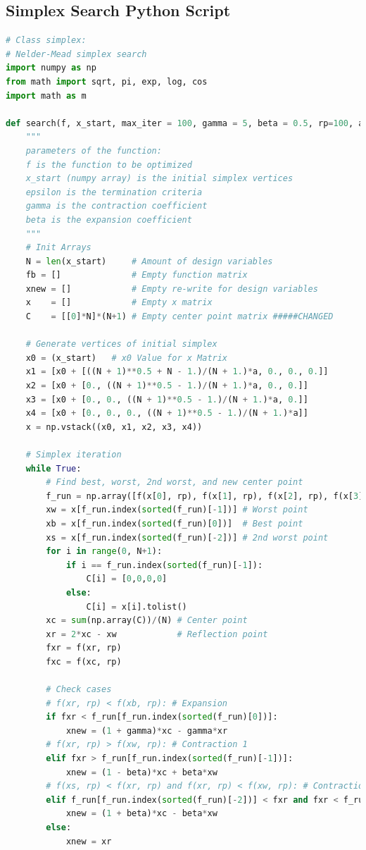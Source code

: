\documentclass[]{aiaa-tc}%
\begin{document}
\subsection{Simplex Search Python Script}
\begin{lstlisting}[language=Python]
# Class simplex: 
# Nelder-Mead simplex search
import numpy as np
from math import sqrt, pi, exp, log, cos
import math as m

def search(f, x_start, max_iter = 100, gamma = 5, beta = 0.5, rp=100, a=10, epsilon = 1E-6):
    """
    parameters of the function:
    f is the function to be optimized
    x_start (numpy array) is the initial simplex vertices
    epsilon is the termination criteria
    gamma is the contraction coefficient
    beta is the expansion coefficient
    """
    # Init Arrays
    N = len(x_start)     # Amount of design variables
    fb = []              # Empty function matrix
    xnew = []            # Empty re-write for design variables
    x    = []            # Empty x matrix
    C    = [[0]*N]*(N+1) # Empty center point matrix #####CHANGED
    
    # Generate vertices of initial simplex
    x0 = (x_start)   # x0 Value for x Matrix
    x1 = [x0 + [((N + 1)**0.5 + N - 1.)/(N + 1.)*a, 0., 0., 0.]]
    x2 = [x0 + [0., ((N + 1)**0.5 - 1.)/(N + 1.)*a, 0., 0.]]
    x3 = [x0 + [0., 0., ((N + 1)**0.5 - 1.)/(N + 1.)*a, 0.]]
    x4 = [x0 + [0., 0., 0., ((N + 1)**0.5 - 1.)/(N + 1.)*a]]
    x = np.vstack((x0, x1, x2, x3, x4))

    # Simplex iteration
    while True:
        # Find best, worst, 2nd worst, and new center point
        f_run = np.array([f(x[0], rp), f(x[1], rp), f(x[2], rp), f(x[3], rp), f(x[4], rp)]).tolist() # Func. values at vertices
        xw = x[f_run.index(sorted(f_run)[-1])] # Worst point
        xb = x[f_run.index(sorted(f_run)[0])]  # Best point
        xs = x[f_run.index(sorted(f_run)[-2])] # 2nd worst point        
        for i in range(0, N+1):
            if i == f_run.index(sorted(f_run)[-1]):
                C[i] = [0,0,0,0]
            else:
                C[i] = x[i].tolist()
        xc = sum(np.array(C))/(N) # Center point
        xr = 2*xc - xw            # Reflection point
        fxr = f(xr, rp)
        fxc = f(xc, rp)
        
        # Check cases
        # f(xr, rp) < f(xb, rp): # Expansion
        if fxr < f_run[f_run.index(sorted(f_run)[0])]:    
            xnew = (1 + gamma)*xc - gamma*xr
        # f(xr, rp) > f(xw, rp): # Contraction 1
        elif fxr > f_run[f_run.index(sorted(f_run)[-1])]:
            xnew = (1 - beta)*xc + beta*xw
        # f(xs, rp) < f(xr, rp) and f(xr, rp) < f(xw, rp): # Contraction 2
        elif f_run[f_run.index(sorted(f_run)[-2])] < fxr and fxr < f_run[f_run.index(sorted(f_run)[-1])]: 
            xnew = (1 + beta)*xc - beta*xw
        else:
            xnew = xr
        

\end{lstlisting}
\end{document}
